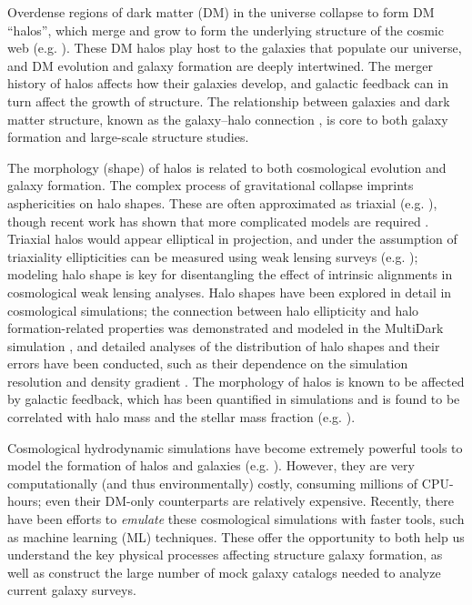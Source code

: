 Overdense regions of dark matter (DM) in the universe collapse to form DM ``halos'', which merge and grow to form the underlying structure of the cosmic web (e.g. \citealt{davis_evolution_1985,bond_how_1996,boylan-kolchin_resolving_2009}). 
These DM halos play host to the galaxies that populate our universe, and DM evolution and galaxy formation are deeply intertwined. 
The merger history of halos affects how their galaxies develop, and galactic feedback can in turn affect the growth of structure.
The relationship between galaxies and dark matter structure, known as the galaxy--halo connection \citep{WechslerTinker2018}, is core to both galaxy formation and large-scale structure studies.

The morphology (shape) of halos is related to both cosmological evolution and galaxy formation.
The complex process of gravitational collapse imprints asphericities on halo shapes.
These are often approximated as triaxial (e.g. \citealt{angrick_triaxial_2010}), though recent work has shown that more complicated models are required \citep{bonnet_morphology_2022}.
Triaxial halos would appear elliptical in projection, and under the assumption of triaxiality ellipticities can be measured using weak lensing surveys (e.g. \citealt{robison_shape_2022,schrabback_tightening_2021}); modeling halo shape is key for disentangling the effect of intrinsic alignments in cosmological weak lensing analyses.
Halo shapes have been explored in detail in cosmological simulations; the connection between halo ellipticity and halo formation-related properties was demonstrated and modeled in the MultiDark simulation \citep{lau_correlations_2021}, and detailed analyses of the distribution of halo shapes and their errors have been conducted, such as their dependence on the simulation resolution \citep{schneider_shapes_2012} and density gradient \citep{fischer_sensitivity_2023}.
The morphology of halos is known to be affected by galactic feedback, which has been quantified in simulations and is found to be correlated with halo mass and the stellar mass fraction (e.g. \citealt{chua_impact_2022}).

Cosmological hydrodynamic simulations have become extremely powerful tools to model the formation of halos and galaxies (e.g. \citealt{springel_gadget_2001, genel_introducing_2014,dave_simba_2019}).
However, they are very computationally (and thus environmentally) costly, consuming millions of CPU-hours; even their DM-only counterparts are relatively expensive.
Recently, there have been efforts to \emph{emulate} these cosmological simulations with faster tools, such as machine learning (ML) techniques.
These offer the opportunity to both help us understand the key physical processes affecting structure galaxy formation, as well as construct the large number of mock galaxy catalogs needed to analyze current galaxy surveys. 


